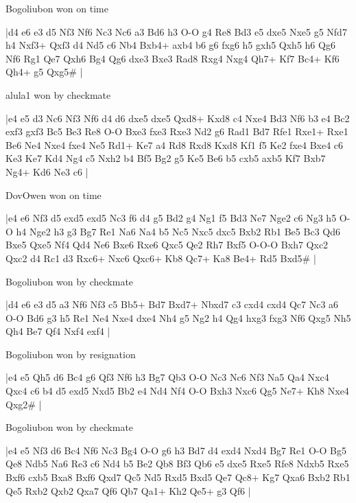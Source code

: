 \showboard

Bogoliubon won on time

\makegametitle
|d4 e6 e3 d5 Nf3 Nf6 Nc3 Nc6 a3 Bd6 h3 O-O g4 Re8 Bd3 e5 dxe5 Nxe5 g5 Nfd7 h4 Nxf3+ Qxf3 d4 Nd5 c6 Nb4 Bxb4+ axb4 b6 g6 fxg6 h5 gxh5 Qxh5 h6 Qg6 Nf6 Rg1 Qe7 Qxh6 Bg4 Qg6 dxe3 Bxe3 Rad8 Rxg4 Nxg4 Qh7+ Kf7 Bc4+ Kf6 Qh4+ g5 Qxg5\#  |

\showboard

alula1 won by checkmate

\makegametitle
|e4 e5 d3 Nc6 Nf3 Nf6 d4 d6 dxe5 dxe5 Qxd8+ Kxd8 c4 Nxe4 Bd3 Nf6 b3 e4 Bc2 exf3 gxf3 Bc5 Be3 Re8 O-O Bxe3 fxe3 Rxe3 Nd2 g6 Rad1 Bd7 Rfe1 Rxe1+ Rxe1 Be6 Ne4 Nxe4 fxe4 Ne5 Rd1+ Ke7 a4 Rd8 Rxd8 Kxd8 Kf1 f5 Ke2 fxe4 Bxe4 c6 Ke3 Ke7 Kd4 Ng4 c5 Nxh2 b4 Bf5 Bg2 g5 Ke5 Be6 b5 cxb5 axb5 Kf7 Bxb7 Ng4+ Kd6 Ne3 c6  |

\showboard

DovOwen won on time

\makegametitle
|e4 e6 Nf3 d5 exd5 exd5 Nc3 f6 d4 g5 Bd2 g4 Ng1 f5 Bd3 Ne7 Nge2 c6 Ng3 h5 O-O h4 Nge2 h3 g3 Bg7 Re1 Na6 Na4 b5 Nc5 Nxc5 dxc5 Bxb2 Rb1 Be5 Bc3 Qd6 Bxe5 Qxe5 Nf4 Qd4 Ne6 Bxe6 Rxe6 Qxc5 Qe2 Rh7 Bxf5 O-O-O Bxh7 Qxc2 Qxc2 d4 Rc1 d3 Rxc6+ Nxc6 Qxc6+ Kb8 Qc7+ Ka8 Be4+ Rd5 Bxd5\#  |

\showboard

Bogoliubon won by checkmate

\makegametitle
|d4 e6 e3 d5 a3 Nf6 Nf3 c5 Bb5+ Bd7 Bxd7+ Nbxd7 c3 cxd4 cxd4 Qc7 Nc3 a6 O-O Bd6 g3 h5 Re1 Ne4 Nxe4 dxe4 Nh4 g5 Ng2 h4 Qg4 hxg3 fxg3 Nf6 Qxg5 Nh5 Qh4 Be7 Qf4 Nxf4 exf4  |

\showboard

Bogoliubon won by resignation

\makegametitle
|e4 e5 Qh5 d6 Bc4 g6 Qf3 Nf6 h3 Bg7 Qb3 O-O Nc3 Nc6 Nf3 Na5 Qa4 Nxc4 Qxc4 c6 b4 d5 exd5 Nxd5 Bb2 e4 Nd4 Nf4 O-O Bxh3 Nxc6 Qg5 Ne7+ Kh8 Nxe4 Qxg2\#  |

\showboard

Bogoliubon won by checkmate

\makegametitle
|e4 e5 Nf3 d6 Bc4 Nf6 Nc3 Bg4 O-O g6 h3 Bd7 d4 exd4 Nxd4 Bg7 Re1 O-O Bg5 Qe8 Ndb5 Na6 Re3 c6 Nd4 b5 Be2 Qb8 Bf3 Qb6 e5 dxe5 Rxe5 Rfe8 Ndxb5 Rxe5 Bxf6 cxb5 Bxa8 Bxf6 Qxd7 Qc5 Nd5 Rxd5 Bxd5 Qe7 Qc8+ Kg7 Qxa6 Bxb2 Rb1 Qe5 Rxb2 Qxb2 Qxa7 Qf6 Qb7 Qa1+ Kh2 Qe5+ g3 Qf6  |

